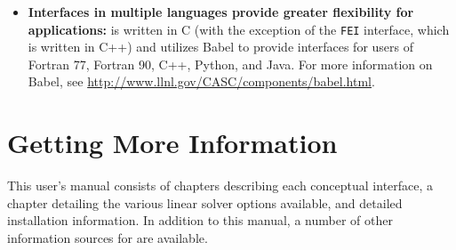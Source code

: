 \begin{itemize}
\item
{\bf Interfaces in multiple languages provide greater flexibility for
applications:} \hypre{} is written in C (with the exception of the {\tt FEI}
interface, which is written in C++) and utilizes Babel to provide
interfaces for users of Fortran 77, Fortran 90, C++, Python, and Java.
For more information on Babel, see
\url{http://www.llnl.gov/CASC/components/babel.html}.

\end{itemize}




\section{Getting More Information}

This user's manual consists of chapters describing each conceptual
interface, a chapter detailing the various linear solver options
available, and detailed installation information.  In addition to this
manual, a number of other information sources for
\hypre{} are available.


